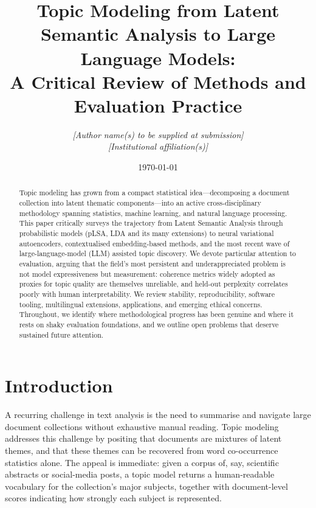\documentclass[11pt,a4paper]{article}
\title{\textbf{Topic Modeling from Latent Semantic Analysis to
  Large Language Models:\\
  A Critical Review of Methods and Evaluation Practice}}
\author{%
  \textit{[Author name(s) to be supplied at submission]}\\[4pt]
  \textit{[Institutional affiliation(s)]}
}
\date{\today}
\begin{document}
\maketitle
\begin{abstract}
Topic modeling has grown from a compact statistical idea—decomposing
a document collection into latent thematic components—into an active
cross-disciplinary methodology spanning statistics, machine learning,
and natural language processing.
This paper critically surveys the trajectory from Latent Semantic
Analysis through probabilistic models (pLSA, LDA and its many
extensions) to neural variational autoencoders, contextualised
embedding-based methods, and the most recent wave of
large-language-model (LLM) assisted topic discovery.
We devote particular attention to evaluation, arguing that the field's
most persistent and underappreciated problem is not model expressiveness
but measurement: coherence metrics widely adopted as proxies for
topic quality are themselves unreliable, and held-out perplexity
correlates poorly with human interpretability.
We review stability, reproducibility, software tooling, multilingual
extensions, applications, and emerging ethical concerns.
Throughout, we identify where methodological progress has been genuine
and where it rests on shaky evaluation foundations, and we outline
open problems that deserve sustained future attention.
\end{abstract}

\tableofcontents
\newpage

\section{Introduction}
\label{sec:introduction}

A recurring challenge in text analysis is the need to summarise and
navigate large document collections without exhaustive manual reading.
Topic modeling addresses this challenge by positing that documents are
mixtures of latent themes, and that these themes can be recovered from
word co-occurrence statistics alone.
The appeal is immediate: given a corpus of, say, scientific abstracts or
social-media posts, a topic model returns a human-readable vocabulary
for the collection's major subjects, together with document-level
scores indicating how strongly each subject is represented.
\end{document}
